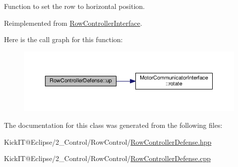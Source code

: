 Function to set the row to horizontal position. 

Reimplemented from \hyperlink{class_row_controller_interface_ab6cc6124c349921882f9ceb6958b8845}{Row\+Controller\+Interface}.



Here is the call graph for this function\+:\nopagebreak
\begin{figure}[H]
\begin{center}
\leavevmode
\includegraphics[width=350pt]{class_row_controller_defense_a59de61112af1c45d6757a879c2e10ff1_cgraph}
\end{center}
\end{figure}




The documentation for this class was generated from the following files\+:\begin{DoxyCompactItemize}
\item 
Kick\+I\+T@\+Eclipse/2\+\_\+\+Control/\+Row\+Control/\hyperlink{_row_controller_defense_8hpp}{Row\+Controller\+Defense.\+hpp}\item 
Kick\+I\+T@\+Eclipse/2\+\_\+\+Control/\+Row\+Control/\hyperlink{_row_controller_defense_8cpp}{Row\+Controller\+Defense.\+cpp}\end{DoxyCompactItemize}
